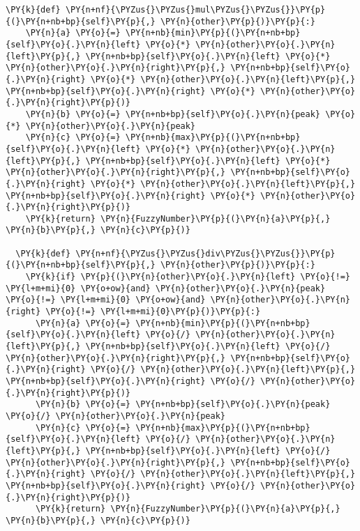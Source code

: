 \begin{Verbatim}[commandchars=\\\{\}]
  \PY{k}{def} \PY{n+nf}{\PYZus{}\PYZus{}mul\PYZus{}\PYZus{}}\PY{p}{(}\PY{n+nb+bp}{self}\PY{p}{,} \PY{n}{other}\PY{p}{)}\PY{p}{:}
    \PY{n}{a} \PY{o}{=} \PY{n+nb}{min}\PY{p}{(}\PY{n+nb+bp}{self}\PY{o}{.}\PY{n}{left} \PY{o}{*} \PY{n}{other}\PY{o}{.}\PY{n}{left}\PY{p}{,} \PY{n+nb+bp}{self}\PY{o}{.}\PY{n}{left} \PY{o}{*} \PY{n}{other}\PY{o}{.}\PY{n}{right}\PY{p}{,} \PY{n+nb+bp}{self}\PY{o}{.}\PY{n}{right} \PY{o}{*} \PY{n}{other}\PY{o}{.}\PY{n}{left}\PY{p}{,} \PY{n+nb+bp}{self}\PY{o}{.}\PY{n}{right} \PY{o}{*} \PY{n}{other}\PY{o}{.}\PY{n}{right}\PY{p}{)}
    \PY{n}{b} \PY{o}{=} \PY{n+nb+bp}{self}\PY{o}{.}\PY{n}{peak} \PY{o}{*} \PY{n}{other}\PY{o}{.}\PY{n}{peak}
    \PY{n}{c} \PY{o}{=} \PY{n+nb}{max}\PY{p}{(}\PY{n+nb+bp}{self}\PY{o}{.}\PY{n}{left} \PY{o}{*} \PY{n}{other}\PY{o}{.}\PY{n}{left}\PY{p}{,} \PY{n+nb+bp}{self}\PY{o}{.}\PY{n}{left} \PY{o}{*} \PY{n}{other}\PY{o}{.}\PY{n}{right}\PY{p}{,} \PY{n+nb+bp}{self}\PY{o}{.}\PY{n}{right} \PY{o}{*} \PY{n}{other}\PY{o}{.}\PY{n}{left}\PY{p}{,} \PY{n+nb+bp}{self}\PY{o}{.}\PY{n}{right} \PY{o}{*} \PY{n}{other}\PY{o}{.}\PY{n}{right}\PY{p}{)}
    \PY{k}{return} \PY{n}{FuzzyNumber}\PY{p}{(}\PY{n}{a}\PY{p}{,} \PY{n}{b}\PY{p}{,} \PY{n}{c}\PY{p}{)}

  \PY{k}{def} \PY{n+nf}{\PYZus{}\PYZus{}div\PYZus{}\PYZus{}}\PY{p}{(}\PY{n+nb+bp}{self}\PY{p}{,} \PY{n}{other}\PY{p}{)}\PY{p}{:}
    \PY{k}{if} \PY{p}{(}\PY{n}{other}\PY{o}{.}\PY{n}{left} \PY{o}{!=} \PY{l+m+mi}{0} \PY{o+ow}{and} \PY{n}{other}\PY{o}{.}\PY{n}{peak} \PY{o}{!=} \PY{l+m+mi}{0} \PY{o+ow}{and} \PY{n}{other}\PY{o}{.}\PY{n}{right} \PY{o}{!=} \PY{l+m+mi}{0}\PY{p}{)}\PY{p}{:}
      \PY{n}{a} \PY{o}{=} \PY{n+nb}{min}\PY{p}{(}\PY{n+nb+bp}{self}\PY{o}{.}\PY{n}{left} \PY{o}{/} \PY{n}{other}\PY{o}{.}\PY{n}{left}\PY{p}{,} \PY{n+nb+bp}{self}\PY{o}{.}\PY{n}{left} \PY{o}{/} \PY{n}{other}\PY{o}{.}\PY{n}{right}\PY{p}{,} \PY{n+nb+bp}{self}\PY{o}{.}\PY{n}{right} \PY{o}{/} \PY{n}{other}\PY{o}{.}\PY{n}{left}\PY{p}{,} \PY{n+nb+bp}{self}\PY{o}{.}\PY{n}{right} \PY{o}{/} \PY{n}{other}\PY{o}{.}\PY{n}{right}\PY{p}{)}
      \PY{n}{b} \PY{o}{=} \PY{n+nb+bp}{self}\PY{o}{.}\PY{n}{peak} \PY{o}{/} \PY{n}{other}\PY{o}{.}\PY{n}{peak}
      \PY{n}{c} \PY{o}{=} \PY{n+nb}{max}\PY{p}{(}\PY{n+nb+bp}{self}\PY{o}{.}\PY{n}{left} \PY{o}{/} \PY{n}{other}\PY{o}{.}\PY{n}{left}\PY{p}{,} \PY{n+nb+bp}{self}\PY{o}{.}\PY{n}{left} \PY{o}{/} \PY{n}{other}\PY{o}{.}\PY{n}{right}\PY{p}{,} \PY{n+nb+bp}{self}\PY{o}{.}\PY{n}{right} \PY{o}{/} \PY{n}{other}\PY{o}{.}\PY{n}{left}\PY{p}{,} \PY{n+nb+bp}{self}\PY{o}{.}\PY{n}{right} \PY{o}{/} \PY{n}{other}\PY{o}{.}\PY{n}{right}\PY{p}{)}
      \PY{k}{return} \PY{n}{FuzzyNumber}\PY{p}{(}\PY{n}{a}\PY{p}{,} \PY{n}{b}\PY{p}{,} \PY{n}{c}\PY{p}{)}


\end{Verbatim}
